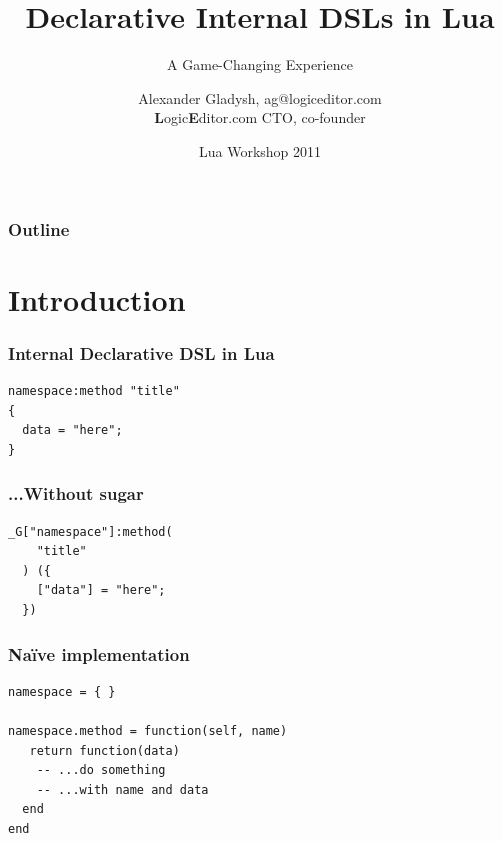 \documentclass[handout]{beamer}
\title{Declarative Internal DSLs in Lua}
\subtitle{A Game-Changing Experience}
\author{Alexander Gladysh, ag@logiceditor.com\\\textbf{L}ogic\textbf{E}ditor.com CTO, co-founder}
\date{Lua Workshop 2011}
\begin{document}
\maketitle


\begin{frame}

\frametitle{Outline}

\tableofcontents

\end{frame}


\section{Introduction}


\begin{frame}[fragile]

\frametitle{Internal Declarative DSL in Lua}

\begin{verbatim}
namespace:method "title"
{
  data = "here";
}
\end{verbatim}

\end{frame}


\begin{frame}[fragile]

\frametitle{...Without sugar}

\begin{verbatim}
_G["namespace"]:method(
    "title"
  ) ({
    ["data"] = "here";
  })
\end{verbatim}

\end{frame}


\begin{frame}[fragile]

\frametitle{Naïve implementation}

\begin{verbatim}
namespace = { }

namespace.method = function(self, name)
   return function(data)
    -- ...do something
    -- ...with name and data
  end
end
\end{verbatim}

\end{frame}
\end{document}

